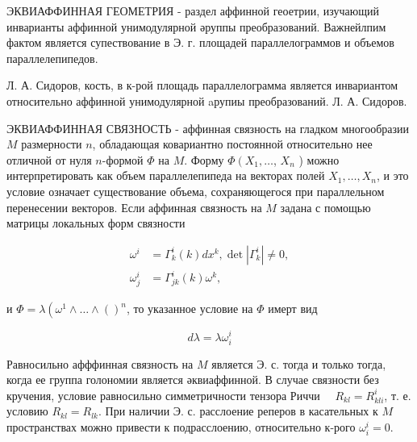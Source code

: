 \documentclass[10pt]{article}
\begin{document}
ЭКВИАФФИННАЯ ГЕОМЕТРИЯ - раздел аффинной геоетрии, изучающий инварианты аффинной унимодулярной әруппы преобразований. Важнейлпим фактом является супествование в Э. г. площадей параллелограммов и объемов параллелепипедов.



Л. А. Сидоров, кость, в к-рой площадь параллелограмма является инвариантом относительно аффинной унимодулярной aрупиы преобразований. Л. А. Сидоров.



ЭКВИАФФИННАЯ СВЯЗНОСТЬ - аффинная связность на гладком многообразии $M$ размерности $n$, обладающая ковариантно постоянной относительно нее отличной от нуля $n$-формой $\Phi$ на $M$. Форму $\Phi\left(X_{1}, \ldots\right.$, $X_{n}$ ) можно интерпретировать как объем параллелепипеда на векторах полей $X_{1}, \ldots, X_{n}$, и это условие означает существование объема, сохраняющегося при параллельном перенесении векторов. Если аффинная связность на $M$ задана с помощью матрицы локальных форм связности



\[

\begin{aligned}

\omega^{i} & =\Gamma_{k}^{i}(k) d x^{k}, \operatorname{det}\left|\Gamma_{k}^{i}\right| \neq 0, \\

\omega_{j}^{i} & =\Gamma_{j k}^{i}(k) \omega^{k},

\end{aligned}

\]



и $\Phi=\lambda\left(\omega^{1} \wedge \ldots \wedge()^{n}\right.$, то указанное условие на $\Phi$ имерт вид



\[

d \lambda=\lambda \omega_{i}^{i}

\]



Равносильно афффинная связность на $M$ является Э. с. тогда и только тогда, когда ее группа голономии является әквиаффинной. В случае связности без кручения, условие равносильно симметричности тензора Риччи $\quad R_{k l}=R_{k l i}^{i}$, т. е. условию $R_{k l}=R_{l k}$. При наличии Э. с. расслоение реперов в касательных к $M$ пространствах можно привести к подрасслоению, относительно к-рого $\omega_{i}^{i}=0$.
\end{document}
